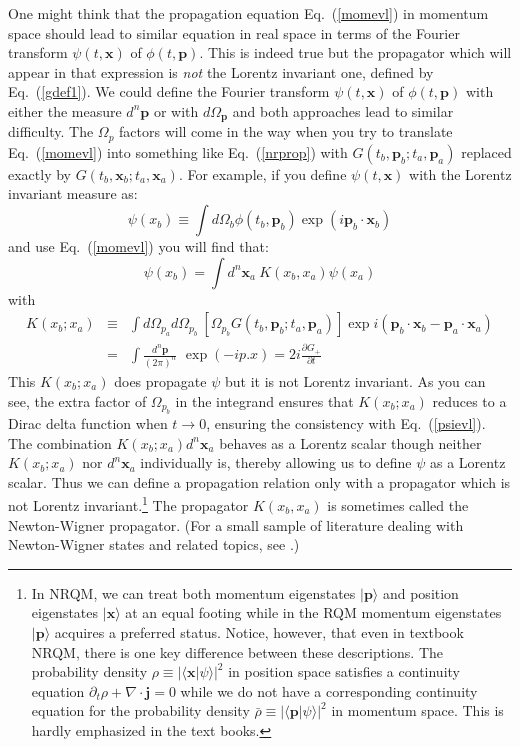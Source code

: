 \documentclass{article}
\def\eq#1{{Eq.~(\ref{#1})}}
\def\ket#1{|#1\rangle}                    %
\def\amp#1#2{\langle #1 | #2\rangle}      %
\begin{document}
 One might think that the propagation equation \eq{momevl} in momentum space should lead to similar equation in real space in terms of the Fourier transform $\psi(t,\bm{x})$ of  $\phi(t,\bm{p})$.  This is indeed true but the propagator which will appear in that expression  is \textit{not} the Lorentz invariant one, defined by \eq{gdef1}. We could define the Fourier transform $\psi(t,\bm{x})$ of  $\phi(t,\bm{p})$ with either the measure $d^n\bm{p}$ or with $d\Omega_{\bm{p}}$ and both approaches lead to similar difficulty. The $\Omega_p$ factors will come in the way when you try to translate \eq{momevl} into something like \eq{nrprop} with $G(t_b,\bm{p}_b; t_a,\bm{p}_a)$ replaced exactly by $G(t_b,\bm{x}_b; t_a,\bm{x}_a)$.
 For example, if you define $\psi(t,\bm{x})$ with the  Lorentz invariant measure as:
 \begin{equation}
  \psi(x_b)\equiv \int d\Omega_b \phi(t_b,\bm{p}_b) \exp (i\bm{p}_b\cdot\bm{x}_b)
 \end{equation} 
 and use \eq{momevl} you will find that:
 \begin{equation}
\psi(x_b) = \int d^n \bm{x}_a\ K(x_b, x_a) \psi(x_a) 
\label{psievl}
\end{equation} 
 with
 \begin{eqnarray}
  K({x}_b; {x}_a)&\equiv& \int d\Omega_{p_a}d\Omega_{p_b}\ [\Omega_{p_b}
  G(t_b,\bm{p}_b; t_a,\bm{p}_a)]\exp i(\bm{p}_b \cdot \bm{x}_b -\bm{p}_a \cdot \bm{x}_a)\nonumber\\
  &=&\int  \frac{d^n\bm{p}}{(2\pi)^n}\,  \, \exp(- i p.x) =2i\frac{\partial G_+}{\partial t}
  \label{kxaxb}
 \end{eqnarray} 
This $K({x}_b; {x}_a)$ does propagate $\psi$ but it is not  Lorentz invariant. As you can see, the extra factor of $\Omega_{p_b}$ in the integrand ensures that $K({x}_b; {x}_a)$ reduces to a Dirac delta function when $t\to0$, ensuring the consistency with \eq{psievl}. The combination $K({x}_b; {x}_a)d^n \bm{x}_a$ behaves as a Lorentz scalar though neither $K({x}_b; {x}_a)$ nor $d^n \bm{x}_a$ individually is, thereby allowing us to define $\psi$  as a Lorentz scalar. Thus we can define a propagation relation only with a propagator which is not Lorentz invariant.\footnote{In NRQM, we can treat both momentum eigenstates $\ket{\bm p}$ and position eigenstates $\ket{\bm x}$ at an equal footing while in the RQM momentum eigenstates $\ket{\bm p}$ acquires a preferred status. Notice, however, that even in textbook NRQM, there is one key difference between these descriptions. The probability density $\rho\equiv|\amp{\bm x}{\psi}|^2$ in position space satisfies a continuity equation $\partial_t\rho+\nabla\cdot\bm{j}=0$ while we do not have a corresponding continuity equation for the probability density $\bar\rho\equiv|\amp{\bm p}{\psi}|^2$ in momentum space. This is hardly emphasized in the text books.}
The propagator $K(x_b,x_a)$ is sometimes called the Newton-Wigner propagator. (For a small sample of literature dealing with Newton-Wigner states and related topics, see  
\cite{A1,B,B4,C5,D,F1,F2,F3,F4,F5,F6,F7,F8,F11}.)
\end{document}
